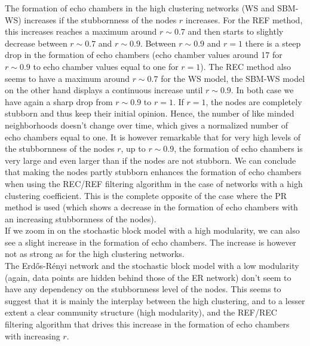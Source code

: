 \documentclass[11 pt , letterpaper , twoside , openright]{book}
\begin{document}
The formation of echo chambers in the high clustering networks (WS and SBM-WS) increases if the stubbornness of the nodes $r$ increases. For the REF method, this increases reaches a maximum around $r \sim 0.7$ and then starts to slightly decrease between $r\sim 0.7$ and $r\sim 0.9$. Between $r \sim 0.9$ and $r=1$ there is a steep drop in the formation of echo chambers (echo chamber values around 17 for $r\sim 0.9$ to echo chamber values equal to one for $r=1$). The REC method also seems to have a maximum around $r \sim 0.7$ for the WS model, the SBM-WS model on the other hand displays a continuous increase until $r \sim 0.9$. In both case we have again a sharp drop from $r \sim 0.9$ to $r=1$. If $r=1$, the nodes are completely stubborn and thus keep their initial opinion. Hence, the number of like minded neighborhoods doesn't change over time, which gives a normalized number of echo chambers equal to one. It is however remarkable that for very high levels of the stubbornness of the nodes $r$, up to $r \sim 0.9$, the formation of echo chambers is very large and even larger than if the nodes are not stubborn. We can conclude that making the nodes partly stubborn enhances the formation of echo chambers when using the REC/REF filtering algorithm in the case of networks with a high clustering coefficient. This is the complete opposite of the case where the PR method is used (which shows a decrease in the formation of echo chambers with an increasing stubbornness of the nodes). %
\\
If we zoom in on the stochastic block model with a high modularity, we can also see a slight increase in the formation of echo chambers. The increase is however not as strong as for the high clustering networks.\\
The Erd\H{o}s-R\'{e}nyi network and the stochastic block model with a low modularity (again, data points are hidden behind those of the ER network) don't seem to have any dependency on the stubbornness level of the nodes. This seems to suggest that it is mainly the interplay between the high clustering, and to a lesser extent a clear community structure (high modularity), and the REF/REC filtering algorithm that drives this increase in the formation of echo chambers with increasing $r$. %
\end{document}
